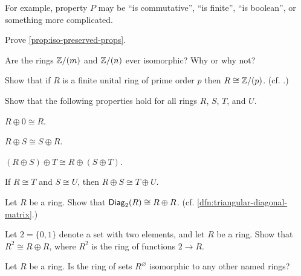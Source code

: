 For example, property \(P\) may be ``is commutative'', ``is finite'', ``is boolean'', or something more complicated.



\Exercises%

\begin{exercise}
Prove \autoref{prop:iso-preserved-props}.
\end{exercise}


\begin{exercise}
Are the rings \(\mathbb{Z}/(m)\) and \(\mathbb{Z}/(n)\) ever isomorphic?
Why or why not?
\end{exercise}


\begin{exercise}
Show that if \(R\) is a finite unital ring of prime order \(p\) then \(R \cong \mathbb{Z}/(p)\).
(cf. .)
\end{exercise}

\begin{exercise}
Show that the following properties hold for all rings \(R\), \(S\), \(T\), and \(U\). \label{exerc:direct-sum-basics}
\begin{proplist*}
\item \label{exerc:direct-sum-basics:zero} \(R \oplus 0 \cong R\).
\item \label{exerc:direct-sum-basics:comm} \(R \oplus S \cong S \oplus R\).
\item \label{exerc:direct-sum-basics:assoc} \((R \oplus S) \oplus T \cong R \oplus (S \oplus T)\).
\item \label{exerc:direct-sum-well-defined} If \(R \cong T\) and \(S \cong U\), then \(R \oplus S \cong T \oplus U\).
\end{proplist*}
\end{exercise}


\begin{exercise}
Let \(R\) be a ring. Show that \(\mathsf{Diag}_{2}(R) \cong R \oplus R\).
(cf. \ref{dfn:triangular-diagonal-matrix}.)
\end{exercise}


\begin{exercise}
Let \(2 = \{ 0, 1 \}\) denote a set with two elements, and let \(R\) be a ring.
Show that \(R^2 \cong R \oplus R\), where \(R^2\) is the ring of functions \(2 \rightarrow R\).
\end{exercise}


\begin{exercise}
Let \(R\) be a ring.
Is the ring of sets \(R^\varnothing\) isomorphic to any other named rings?
\end{exercise}



